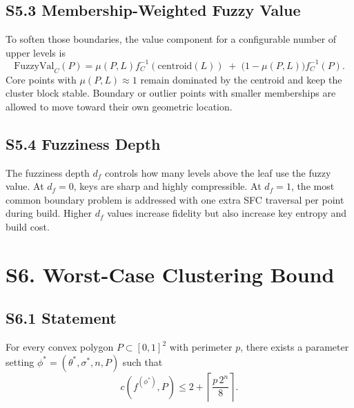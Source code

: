 \documentclass[11pt]{article}
\begin{document}
\subsection*{S5.3 Membership-Weighted Fuzzy Value}
To soften those boundaries, the value component for a configurable number of upper levels is
\[
\mathrm{FuzzyVal}_C(P)=
\mu(P,L)f_C^{-1}(\mathrm{centroid}(L))
\;+\;
\bigl(1-\mu(P,L)\bigr)f_C^{-1}(P).
\]
Core points with $\mu(P,L)\approx1$ remain dominated by the centroid and keep the cluster block stable. Boundary or outlier points with smaller memberships are allowed to move toward their own geometric location.

\subsection*{S5.4 Fuzziness Depth}
The fuzziness depth $d_f$ controls how many levels above the leaf use the fuzzy value. At $d_f=0$, keys are sharp and highly compressible. At $d_f=1$, the most common boundary problem is addressed with one extra SFC traversal per point during build. Higher $d_f$ values increase fidelity but also increase key entropy and build cost.

\section*{S6. Worst-Case Clustering Bound}
\label{sec:si-worst-case}

\subsection*{S6.1 Statement}
For every convex polygon $P\subset[0,1]^2$ with perimeter $p$, there exists a parameter setting $\phi^*=(\theta^*,\sigma^*,n,P)$ such that
\[
c(f^{(\phi^*)},P)\leq 2+\left\lceil\frac{p\,2^n}{8}\right\rceil.
\]
\end{document}
